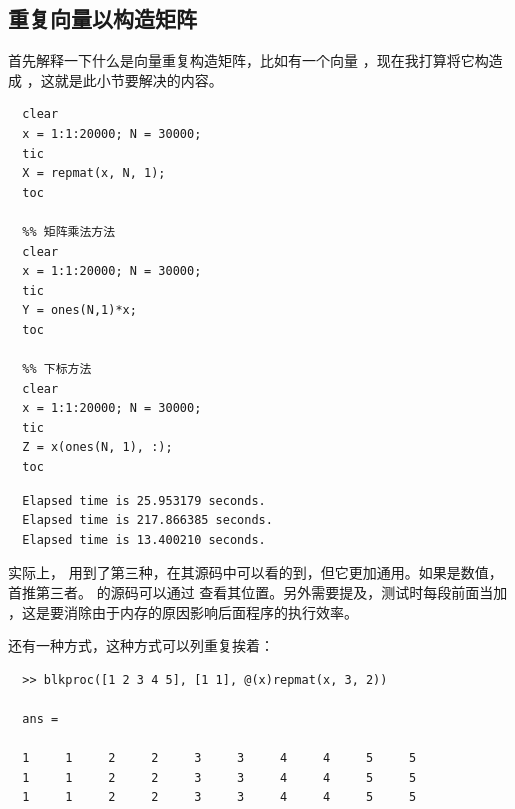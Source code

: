 \subsection{重复向量以构造矩阵}

首先解释一下什么是向量重复构造矩阵，比如有一个向量 \mcode{[1 2 3]}，现在我打算将它构造成 \mcode{[1 2 3; 1 2 3; 1 2 3]}，这就是此小节要解决的内容。

\vspace{-0.8cm}
\begin{lstlisting}[caption = 重复向量以构造矩阵]
  %% repmat 函数方法
  clear
  x = 1:1:20000; N = 30000;
  tic
  X = repmat(x, N, 1);
  toc

  %% 矩阵乘法方法
  clear
  x = 1:1:20000; N = 30000;
  tic
  Y = ones(N,1)*x;
  toc
  
  %% 下标方法
  clear
  x = 1:1:20000; N = 30000;
  tic
  Z = x(ones(N, 1), :);
  toc
\end{lstlisting}

\vspace{-0.8cm}
\begin{lstlisting}
  Elapsed time is 25.953179 seconds.
  Elapsed time is 217.866385 seconds.
  Elapsed time is 13.400210 seconds.
\end{lstlisting}

实际上， 用到了第三种，在其源码中可以看的到，但它更加通用。如果是数值，首推第三者。
  的源码可以通过  查看其位置。另外需要提及，测试时每段前面当加 ，这是要消除由于内存的原因影响后面程序的执行效率。\par

还有一种方式，这种方式可以列重复挨着：

\vspace{-0.4cm}
\begin{lstlisting}
  >> blkproc([1 2 3 4 5], [1 1], @(x)repmat(x, 3, 2))

  ans =

  1     1     2     2     3     3     4     4     5     5
  1     1     2     2     3     3     4     4     5     5
  1     1     2     2     3     3     4     4     5     5 
\end{lstlisting}

